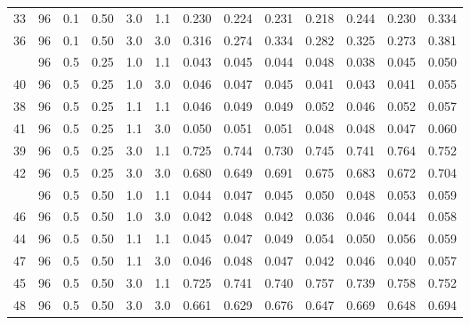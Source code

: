 \begin{longtable}[t]{ccccccrrrrrrc}
33 & 96 & 0.1 & 0.50 & 3.0 & 1.1 & 0.230 & 0.224 & 0.231 & 0.218 & 0.244 & 0.230 & 0.334\\
36 & 96 & 0.1 & 0.50 & 3.0 & 3.0 & 0.316 & 0.274 & 0.334 & 0.282 & 0.325 & 0.273 & 0.381\\
\addlinespace
37 & 96 & 0.5 & 0.25 & 1.0 & 1.1 & 0.043 & 0.045 & 0.044 & 0.048 & 0.038 & 0.045 & 0.050\\
40 & 96 & 0.5 & 0.25 & 1.0 & 3.0 & 0.046 & 0.047 & 0.045 & 0.041 & 0.043 & 0.041 & 0.055\\
38 & 96 & 0.5 & 0.25 & 1.1 & 1.1 & 0.046 & 0.049 & 0.049 & 0.052 & 0.046 & 0.052 & 0.057\\
41 & 96 & 0.5 & 0.25 & 1.1 & 3.0 & 0.050 & 0.051 & 0.051 & 0.048 & 0.048 & 0.047 & 0.060\\
39 & 96 & 0.5 & 0.25 & 3.0 & 1.1 & 0.725 & 0.744 & 0.730 & 0.745 & 0.741 & 0.764 & 0.752\\
42 & 96 & 0.5 & 0.25 & 3.0 & 3.0 & 0.680 & 0.649 & 0.691 & 0.675 & 0.683 & 0.672 & 0.704\\
\addlinespace
43 & 96 & 0.5 & 0.50 & 1.0 & 1.1 & 0.044 & 0.047 & 0.045 & 0.050 & 0.048 & 0.053 & 0.059\\
46 & 96 & 0.5 & 0.50 & 1.0 & 3.0 & 0.042 & 0.048 & 0.042 & 0.036 & 0.046 & 0.044 & 0.058\\
44 & 96 & 0.5 & 0.50 & 1.1 & 1.1 & 0.045 & 0.047 & 0.049 & 0.054 & 0.050 & 0.056 & 0.059\\
47 & 96 & 0.5 & 0.50 & 1.1 & 3.0 & 0.046 & 0.048 & 0.047 & 0.042 & 0.046 & 0.040 & 0.057\\
45 & 96 & 0.5 & 0.50 & 3.0 & 1.1 & 0.725 & 0.741 & 0.740 & 0.757 & 0.739 & 0.758 & 0.752\\
48 & 96 & 0.5 & 0.50 & 3.0 & 3.0 & 0.661 & 0.629 & 0.676 & 0.647 & 0.669 & 0.648 & 0.694\\
\bottomrule
\end{longtable}
\endgroup{}
